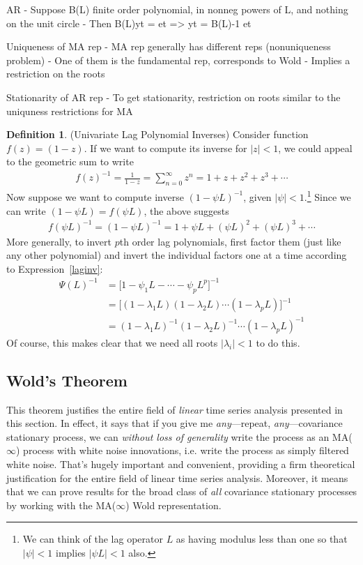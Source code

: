 \documentclass[12pt]{article}
\theoremstyle{plain}
\theoremstyle{definition}
\newtheorem{defn}[thm]{Definition}
\theoremstyle{remark}
\newcommand{\sumninfz}{\sum^\infty_{n=0}}
\begin{document}
AR
- Suppose B(L) finite order polynomial, in nonneg powers of L, and
nothing on the unit circle
- Then B(L)yt = et => yt = B(L)-1 et


Uniqueness of MA rep
- MA rep generally has different reps (nonuniqueness problem)
- One of them is the fundamental rep, corresponds to Wold
- Implies a restriction on the roots

Stationarity of AR rep
- To get stationarity, restriction on roots similar to the uniquness
restrictions for MA


\clearpage
\begin{defn}(Univariate Lag Polynomial Inverses)
Consider function $f(z)=(1-z)$. If we want to compute its inverse for
$|z|<1$, we could appeal to the geometric sum to write
\begin{align*}
  f(z)^{-1} = \frac{1}{1-z}
  = \sumninfz z^n
  = 1+z+z^2 + z^3 + \cdots
\end{align*}
Now suppose we want to compute inverse $(1-\psi L)^{-1}$, given
$|\psi|<1$.\footnote{%
  We can think of the lag operator $L$ as having modulus less than one
  so that $|\psi|<1$ implies $|\psi L|<1$ also.
}
Since we can write $(1-\psi L)=f(\psi L)$, the above suggests
\begin{align}
  f(\psi L)^{-1}
  = (1-\psi L)^{-1}
  = 1+\psi L+(\psi L)^2 + (\psi L)^3 + \cdots
  \label{laginv}
\end{align}
More generally, to invert $p$th order lag polynomials, first factor them
(just like any other polynomial) and invert the individual factors one
at a time according to Expression~\ref{laginv}:
\begin{align*}
  \Psi(L)^{-1}
  &= \big[1 - \psi_1 L - \cdots - \psi_pL^p\big]^{-1} \\
  &= \big[(1-\lambda_1L)(1-\lambda_2L)\cdots(1-\lambda_pL)\big]^{-1}
  \\
  &= (1-\lambda_1L)^{-1}(1-\lambda_2L)^{-1}\cdots(1-\lambda_pL)^{-1}
\end{align*}
Of course, this makes clear that we need all roots $|\lambda_i|<1$ to do
this.
\end{defn}


\clearpage
\subsection{Wold's Theorem}

This theorem justifies the entire field of \emph{linear} time series
analysis presented in this section. In effect, it says that if you give
me \emph{any}---repeat, \emph{any}---covariance stationary process, we
can \emph{without loss of generality} write the process as an
MA($\infty$) process with white noise innovations, i.e. write the
process as simply filtered white noise.
That's hugely important and convenient, providing a firm theoretical
justification for the entire field of linear time series analysis.
Moreover, it means that we can prove results for the broad class of
\emph{all} covariance stationary processes by working with the
MA($\infty$) Wold representation.
\end{document}
